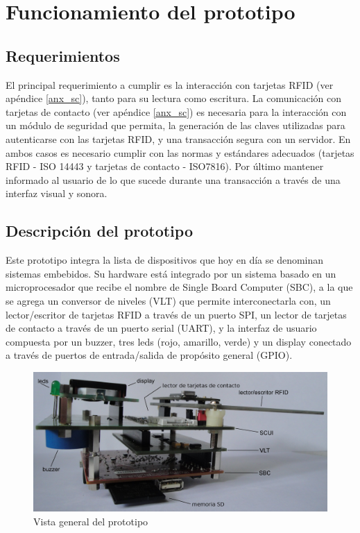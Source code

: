 \chapter{Funcionamiento del prototipo}

\section{Requerimientos}
El principal requerimiento a cumplir es la interacción con tarjetas RFID (ver apéndice \ref{anx_sc}), tanto para su lectura como escritura.
La comunicación con tarjetas de contacto (ver apéndice \ref{anx_sc}) es necesaria para la interacción con un módulo de seguridad que permita, la generación de las claves utilizadas para autenticarse con las tarjetas RFID, y una transacción segura con un servidor. En ambos casos es necesario cumplir con las normas y estándares adecuados  (tarjetas RFID - ISO 14443 y tarjetas de contacto - ISO7816).
Por último mantener informado al usuario de lo que sucede durante una transacción a través de una interfaz visual y sonora.


\section{Descripción del prototipo}\label{2.2}
Este prototipo integra la lista de dispositivos que hoy en día se denominan sistemas embebidos. Su hardware está integrado por un sistema basado en un microprocesador que  recibe el nombre de Single Board Computer (SBC), a la que se agrega un conversor de niveles (VLT) que permite interconectarla con, un lector/escritor de tarjetas RFID a través de un puerto SPI, un lector de tarjetas de contacto a través de un puerto serial (UART), y la interfaz de usuario compuesta por un buzzer, tres leds (rojo, amarillo, verde) y un display conectado a través de puertos de entrada/salida de propósito general (GPIO).

\begin{figure}[H]
\centering
  \begin{center}
   \includegraphics[scale=.15]{Imagenes/prototipo_s_nombres.jpg}
  \end{center}
  \caption{Vista general del prototipo}\label{prototipo} 
\end{figure}


